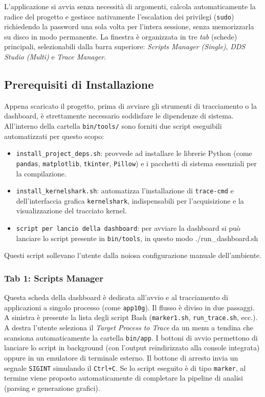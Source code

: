 L'applicazione si avvia senza necessità di argomenti, calcola automaticamente la radice del progetto e gestisce nativamente l'escalation dei privilegi (\texttt{sudo}) richiedendo la password una sola volta per l'intera sessione, senza memorizzarla su disco in modo permanente. La finestra è organizzata in tre \textit{tab} (schede) principali, selezionabili dalla barra superiore: \textit{Scripts Manager (Single)}, \textit{DDS Studio (Multi)} e \textit{Trace Manager}.


\subsection{Prerequisiti di Installazione}
Appena scaricato il progetto, prima di avviare gli strumenti di tracciamento o la dashboard, è strettamente necessario soddisfare le dipendenze di sistema. All'interno della cartella \texttt{bin/tools/} sono forniti due script eseguibili automatizzati per questo scopo:
\begin{itemize}
	\item \texttt{install\_project\_deps.sh}: provvede ad installare le librerie Python (come \texttt{pandas}, \texttt{matplotlib}, \texttt{tkinter}, \texttt{Pillow}) e i pacchetti di sistema essenziali per la compilazione.
	\item \texttt{install\_kernelshark.sh}: automatizza l'installazione di \texttt{trace-cmd} e dell'interfaccia grafica \texttt{kernelshark}, indispensabili per l'acquisizione e la visualizzazione del tracciato kernel.
	\item \texttt{script per lancio della dashboard}: per avviare la dashboard si può lanciare lo script presente in \texttt{bin/tools}, in questo modo ./run\_dashboard.sh
\end{itemize}
Questi script sollevano l'utente dalla noiosa configurazione manuale dell'ambiente.

\clearpage
\subsubsection{Tab 1: Scripts Manager}
Questa scheda della dashboard è dedicata all'avvio e al tracciamento di applicazioni a singolo processo (come \texttt{app10g}). Il flusso è diviso in due passaggi. A sinistra è presente la lista degli script Bash (\texttt{marker1.sh}, \texttt{run\_trace.sh}, ecc.). A destra l'utente seleziona il \textit{Target Process to Trace} da un menu a tendina che scansiona automaticamente la cartella \texttt{bin/app}. I bottoni di avvio permettono di lanciare lo script in background (con l'output reindirizzato alla console integrata) oppure in un emulatore di terminale esterno. Il bottone di arresto invia un segnale \texttt{SIGINT} simulando il \texttt{Ctrl+C}. Se lo script eseguito è di tipo \texttt{marker}, al termine viene proposto automaticamente di completare la pipeline di analisi (parsing e generazione grafici).

